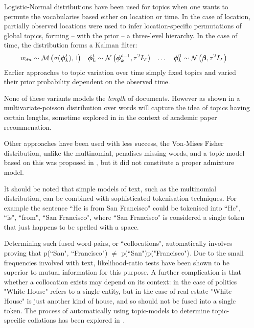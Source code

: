 Logistic-Normal distributions have been used for topics when one wants to permute the vocabularies based either on location \cite{Eisenstein2010} or time\cite{Blei2006a}. In the case of location, partially observed locations were used to infer location-specific permutations of global topics, forming -- with the prior -- a three-level hierarchy. In the case of time, the distribution forms a Kalman filter:
\begin{align}
w_{dn} & \sim \mathcal{M} \left( {\sigma(\bm \phi_k^t)},{1} \right) &
\bm \phi_k^t & \sim \mathcal{N} \left( {\bm \phi_k^{t-1}}, {\tau^2 I_T} \right) & \ldots\quad
\bm \phi_k^0 & \sim \mathcal{N} \left( {\bm \beta}, {\tau^2 I_T} \right)
\end{align}
Earlier approaches to topic variation over time simply fixed topics and varied their prior probability dependent on the observed time\cite{Wang2006}. 
 
None of these variants models the \emph{length} of documents. However as shown in  a multivariate-poisson distribution over words will capture the idea of topics having certain lengths, sometime explored in\cite{Gopalan2013} in the context of academic paper recommenation.

Other approaches have been used with less success, the Von-Mises Fisher distribution, unlike the multinomial, penalises missing words, and a topic model based on this was proposed in \cite{Reisinger2010}, but it did not constitute a proper admixture model.

It should be noted that simple models of text, such as the multinomial distribution, can be combined with sophisticated tokenisation techniques. For example the sentence ``He is from San Francisco" could be tokenised into {``He", ``is", ``from", ``San Francisco"}, where ``San Francisco" is considered a single token that just happens to be spelled with a space.

Determining such fused word-pairs, or ``collocations", automatically  involves proving that p(``San", ``Francisco") $\neq$ p(``San")p("Francisco"). Due to the small frequencies involved with text, likelihood-ratio tests have been shown to be superior to mutual information for this purpose\cite{Dunning1993}. A further complication is that whether a collocation exists may depend on its context: in the case of politics "White House" refers to a single entity, but in the case of real-estate "White House" is just another kind of house, and so should not be fused into a single token. The process of automatically using topic-models to determine topic-specific collations has been explored in \cite{Johnson2010}.


